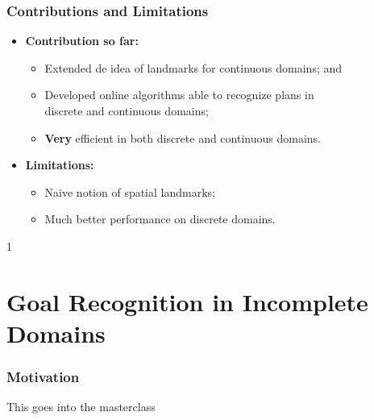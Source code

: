 \documentclass{beamer}
\newcommand{\todo}[1]{ {\color{red} #1} }
\def\masterclass{1}
\begin{document}
	\begin{frame}[c]\frametitle{Contributions and Limitations}
   	\begin{itemize}
   		\item \textbf{Contribution so far:}
			\begin{itemize}
				\item Extended de idea of landmarks for continuous domains; and
				\item Developed online algorithms able to recognize plans in\\ discrete and continuous domains;
				\item \textbf{Very} efficient in both discrete and continuous domains.
			\end{itemize}
		\item \textbf{Limitations:}
			\begin{itemize}
				\item Naive notion of spatial landmarks;
				\item Much better performance on discrete domains.
			\end{itemize}
	\end{itemize}
	\end{frame}


\if\masterclass1
\section{Goal Recognition in Incomplete Domains}

\begin{frame}[c]\frametitle{Motivation}
	\todo{This goes into the masterclass}
\end{frame}
\end{document}
